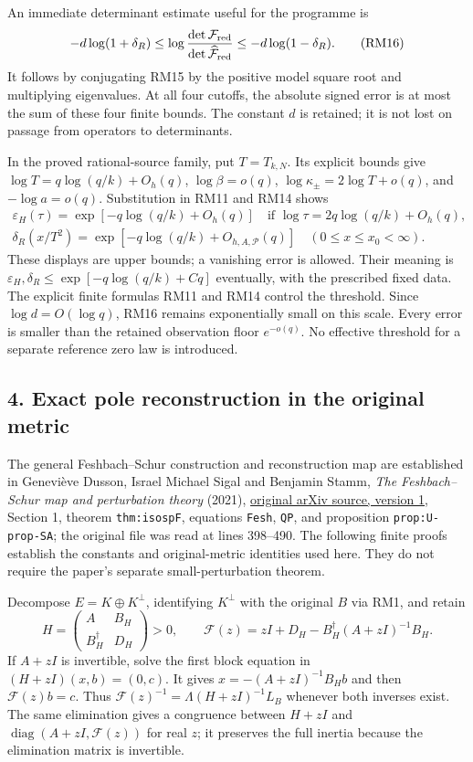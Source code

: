 \documentclass[11pt]{article}
\begin{document}
An immediate determinant estimate useful for the programme is \[
-d\log(1+\delta_R)\le
\log{\det\mathcal F_{\rm red}\over\det\widehat{\mathcal F}_{\rm red}}
\le-d\log(1-\delta_R).
\tag{RM16}
\] It follows by conjugating RM15 by the positive model square root and multiplying eigenvalues. At all four cutoffs, the absolute signed error is at most the sum of these four finite bounds. The constant \(d\) is retained; it is not lost on passage from operators to determinants.

In the proved rational-source family, put \(T=T_{k,N}\). Its explicit bounds give \(\log T=q\log(q/k)+O_h(q)\), \(\log\beta=o(q)\), \(\log\kappa_\pm=2\log T+o(q)\), and \(-\log a=o(q)\). Substitution in RM11 and RM14 shows \[
\begin{gathered}
\varepsilon_H(\tau)=\exp[-q\log(q/k)+O_h(q)]
\quad\text{if }\log\tau=2q\log(q/k)+O_h(q),\\
\delta_R(x/T^2)=\exp[-q\log(q/k)+O_{h,A,\mathscr P}(q)]
\quad(0\le x\le x_0<\infty).
\end{gathered}\tag{RM17}
\] These displays are upper bounds; a vanishing error is allowed. Their meaning is \(\varepsilon_H,\delta_R\le\exp[-q\log(q/k)+Cq]\) eventually, with the prescribed fixed data. The explicit finite formulas RM11 and RM14 control the threshold. Since \(\log d=O(\log q)\), RM16 remains exponentially small on this scale. Every error is smaller than the retained observation floor \(e^{-o(q)}\). No effective threshold for a separate reference zero law is introduced.

\subsection{4. Exact pole reconstruction in the original metric}\label{exact-pole-reconstruction-in-the-original-metric}

The general Feshbach--Schur construction and reconstruction map are established in Geneviève Dusson, Israel Michael Sigal and Benjamin Stamm, \emph{The Feshbach--Schur map and perturbation theory} (2021), \href{https://arxiv.org/src/2105.02058v1}{original arXiv source, version 1}, Section 1, theorem \texttt{thm:isospF}, equations \texttt{Fesh}, \texttt{QP}, and proposition \texttt{prop:U-prop-SA}; the original file was read at lines 398--490. The following finite proofs establish the constants and original-metric identities used here. They do not require the paper's separate small-perturbation theorem.

Decompose \(E=K\oplus K^\perp\), identifying \(K^\perp\) with the original \(B\) via RM1, and retain \[
H=\begin{pmatrix}A&B_H\\B_H^\dagger&D_H\end{pmatrix}>0,
\qquad
\mathcal F(z)=zI+D_H-B_H^\dagger(A+zI)^{-1}B_H.
\tag{RM18}
\] If \(A+zI\) is invertible, solve the first block equation in \((H+zI)(x,b)=(0,c)\). It gives \(x=-(A+zI)^{-1}B_Hb\) and then \(\mathcal F(z)b=c\). Thus \(\mathcal F(z)^{-1}=\Lambda(H+zI)^{-1}L_B\) whenever both inverses exist. The same elimination gives a congruence between \(H+zI\) and \(\operatorname{diag}(A+zI,\mathcal F(z))\) for real \(z\); it preserves the full inertia because the elimination matrix is invertible.
\end{document}
